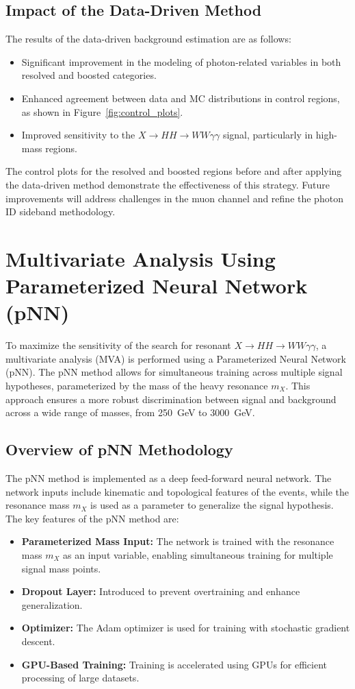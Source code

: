 \subsection{Impact of the Data-Driven Method}
The results of the data-driven background estimation are as follows:
\begin{itemize}
    \item Significant improvement in the modeling of photon-related variables in both resolved and boosted categories.
    \item Enhanced agreement between data and MC distributions in control regions, as shown in Figure~\ref{fig:control_plots}.
    \item Improved sensitivity to the \(X \to HH \to WW\gamma\gamma\) signal, particularly in high-mass regions.
\end{itemize}

The control plots for the resolved and boosted regions before and after applying the data-driven method demonstrate the
effectiveness of this strategy. Future improvements will address challenges in the muon channel and refine the photon ID sideband
methodology.

\section{Multivariate Analysis Using Parameterized Neural Network (pNN)}

To maximize the sensitivity of the search for resonant \(X \to HH \to WW\gamma\gamma\), a multivariate analysis (MVA) is performed
using a Parameterized Neural Network (pNN). The pNN method allows for simultaneous training across multiple signal hypotheses,
parameterized by the mass of the heavy resonance \(m_X\). This approach ensures a more robust discrimination between signal and
background across a wide range of masses, from 250~GeV to 3000~GeV.

\subsection{Overview of pNN Methodology}
The pNN method is implemented as a deep feed-forward neural network. The network inputs include kinematic and topological features of the events, while the resonance mass \(m_X\) is used as a parameter to generalize the signal hypothesis. The key features of the pNN method are:
\begin{itemize}
    \item \textbf{Parameterized Mass Input:} The network is trained with the resonance mass \(m_X\) as an input variable, enabling simultaneous training for multiple signal mass points.
    \item \textbf{Dropout Layer:} Introduced to prevent overtraining and enhance generalization.
    \item \textbf{Optimizer:} The Adam optimizer is used for training with stochastic gradient descent.
    \item \textbf{GPU-Based Training:} Training is accelerated using GPUs for efficient processing of large datasets.
\end{itemize}


